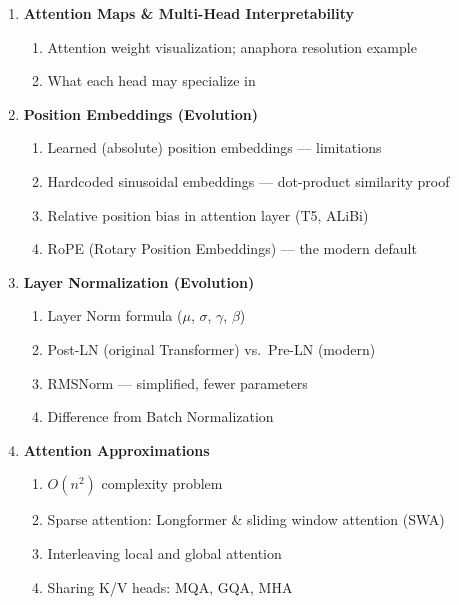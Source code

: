 \documentclass[11pt, a4paper]{article}
\begin{document}
\begin{enumerate}[label=\textbf{\arabic*.}, leftmargin=2em]
  \item \textbf{Attention Maps \& Multi-Head Interpretability}
    \begin{enumerate}[label=\arabic{enumi}.\arabic*]
      \item Attention weight visualization; anaphora resolution example
      \item What each head may specialize in
    \end{enumerate}

  \item \textbf{Position Embeddings (Evolution)}
    \begin{enumerate}[label=\arabic{enumi}.\arabic*]
      \item Learned (absolute) position embeddings --- limitations
      \item Hardcoded sinusoidal embeddings --- dot-product similarity proof
      \item Relative position bias in attention layer (T5, ALiBi)
      \item RoPE (Rotary Position Embeddings) --- the modern default
    \end{enumerate}

  \item \textbf{Layer Normalization (Evolution)}
    \begin{enumerate}[label=\arabic{enumi}.\arabic*]
      \item Layer Norm formula ($\mu$, $\sigma$, $\gamma$, $\beta$)
      \item Post-LN (original Transformer) vs.\ Pre-LN (modern)
      \item RMSNorm --- simplified, fewer parameters
      \item Difference from Batch Normalization
    \end{enumerate}

  \item \textbf{Attention Approximations}
    \begin{enumerate}[label=\arabic{enumi}.\arabic*]
      \item $O(n^2)$ complexity problem
      \item Sparse attention: Longformer \& sliding window attention (SWA)
      \item Interleaving local and global attention
      \item Sharing K/V heads: MQA, GQA, MHA
    \end{enumerate}


\end{enumerate}
\end{document}
